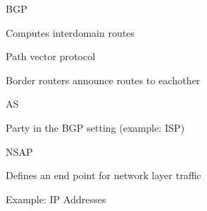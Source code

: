 \documentclass[main.tex]{subfiles}
\begin{document}
\begin{card}{BGP}
\item Computes interdomain routes
\item Path vector protocol
\item Border routers announce routes to eachother
\end{card}

\begin{card}{AS}
\item Party in the BGP setting (example: ISP)
\end{card}

\begin{card}{NSAP}
\item Defines an end point for network layer traffic
\item Example: IP Addresses
\end{card}
\end{document}
